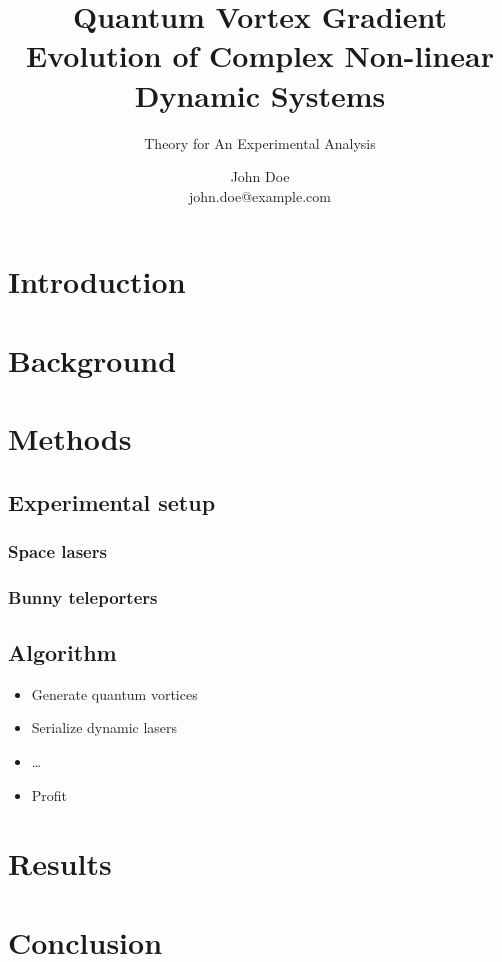 \documentclass[11pt,twocolumn, toc]{paperenhanced}
\title{
    Quantum Vortex Gradient Evolution of Complex Non-linear
    Dynamic Systems
}
\subtitle{
    Theory for An Experimental Analysis
}
\author{
    John Doe \\ john.doe@example.com
}
\begin{document}
    \maketitle
    \makefrontmatter


    \section{Introduction}
    \lipsum[2-3]


    \section{Background}
    \lipsum[4]


    \section{Methods}
    \subsection{Experimental setup}
    \subsubsection{Space lasers}
    \lipsum[5]
    \subsubsection{Bunny teleporters}
    \lipsum[6]
    \subsection{Algorithm}
    \begin{itemize}
        \item {} Generate quantum vortices
        \item {} Serialize dynamic lasers
        \item {} \ldots
        \item {} Profit
    \end{itemize}
    \lipsum[7]


    \section{Results}
    \lipsum[8]

    \section{Conclusion}
    \lipsum[9]

    \nocite{*}
    \printbibliography
\end{document}

